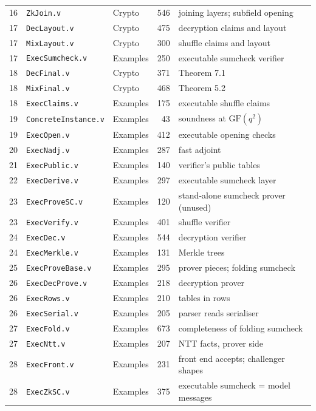 \documentclass[11pt,a4paper]{article}
\theoremstyle{definition}
\theoremstyle{plain}
\begin{document}
{\begin{longtable}{@{}rlp{}rp{}@{}}
16 & \texttt{ZkJoin.v} & Crypto & 546 & joining layers; subfield opening\\
17 & \texttt{DecLayout.v} & Crypto & 475 & decryption claims and layout\\
17 & \texttt{MixLayout.v} & Crypto & 300 & shuffle claims and layout\\
17 & \texttt{ExecSumcheck.v} & Examples & 250 & executable sumcheck verifier\\
18 & \texttt{DecFinal.v} & Crypto & 371 & Theorem 7.1\\
18 & \texttt{MixFinal.v} & Crypto & 468 & Theorem 5.2\\
18 & \texttt{ExecClaims.v} & Examples & 175 & executable shuffle claims\\
19 & \texttt{ConcreteInstance.v} & Examples & 43 & soundness at $\mathrm{GF}(q^2)$\\
19 & \texttt{ExecOpen.v} & Examples & 412 & executable opening checks\\
20 & \texttt{ExecNadj.v} & Examples & 287 & fast adjoint\\
21 & \texttt{ExecPublic.v} & Examples & 140 & verifier's public tables\\
22 & \texttt{ExecDerive.v} & Examples & 297 & executable sumcheck layer\\
23 & \texttt{ExecProveSC.v} & Examples & 120 & stand-alone sumcheck prover (unused)\\
23 & \texttt{ExecVerify.v} & Examples & 401 & shuffle verifier\\
24 & \texttt{ExecDec.v} & Examples & 544 & decryption verifier\\
24 & \texttt{ExecMerkle.v} & Examples & 131 & Merkle trees\\
25 & \texttt{ExecProveBase.v} & Examples & 295 & prover pieces; folding sumcheck\\
26 & \texttt{ExecDecProve.v} & Examples & 218 & decryption prover\\
26 & \texttt{ExecRows.v} & Examples & 210 & tables in rows\\
26 & \texttt{ExecSerial.v} & Examples & 205 & parser reads serialiser\\
27 & \texttt{ExecFold.v} & Examples & 673 & completeness of folding sumcheck\\
27 & \texttt{ExecNtt.v} & Examples & 207 & NTT facts, prover side\\
28 & \texttt{ExecFront.v} & Examples & 231 & front end accepts; challenger shapes\\
28 & \texttt{ExecZkSC.v} & Examples & 375 & executable sumcheck = model messages\\

\end{longtable}}
\end{document}
